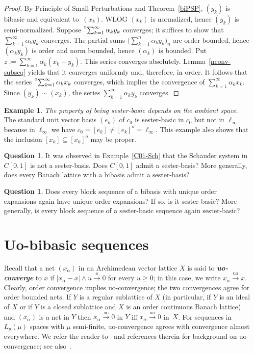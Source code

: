 \documentclass[12pt]{amsart}
\theoremstyle{plain}
\theoremstyle{definition}
\newtheorem{question}[theorem]{Question}
\newtheorem{example}[theorem]{Example}
\newcommand{\abs}[1]{\lvert#1\rvert}
\newcommand{\term}[1]{{\textit{\textbf{#1}}}}   %
\newcommand{\goeso}{\xrightarrow{\mathrm{o}}}	%
\newcommand{\goesuo}{\xrightarrow{\mathrm{uo}}}	%
\newcommand{\s}{\sum_{k=1}^\infty}
\newcommand{\tos}{\prescript{{\rm o}}{}{\sum_{k=1}^\infty\,}}
\renewcommand{\ge}{\geqslant}
\begin{document}
\begin{proof}
  By Principle of Small Perturbations and Theorem~\ref{biPSP}, $(y_k)$
  is bibasic and equivalent to~$(x_k)$. WLOG $(x_k)$ is normalized,
  hence $(y_k)$ is semi-normalized. Suppose $\tos\alpha_ky_k$
  converges; it suffices to show that $\s\alpha_ky_k$ converges. The
  partial sums $\bigl(\sum_{k=1}^n \alpha_ky_k\bigr)_n$ are order
  bounded, hence $(\alpha_k y_k)$ is order and norm bounded, hence
  $(\alpha_k)$ is bounded.  Put
  $z:=\sum_{k=1}^\infty \alpha_k(x_k-y_k)$. This series converges
  absolutely. Lemma~\ref{nconv-subseq} yields that it converges
  uniformly and, therefore, in order. It follows that the series
  $\tos\alpha_kx_k$ converges, which implies the convergence of
  $\s\alpha_kx_k$. Since $(y_k)\sim(x_k)$, the series $\s\alpha_ky_k$
  converges.
\end{proof}

\begin{example}\label{sester-dep-amb}
    \emph{The
    property of being sester-basic depends on the ambient space.}
    The standard unit vector basis $(e_k)$ of $c_0$ is
    sester-basic in $c_0$ but not in $\ell_\infty$ because in
    $\ell_\infty$ we have $c_0=[e_k]\neq[e_k]^o=\ell_\infty$. This
    example also shows that the inclusion $[x_k]\subseteq[x_k]^o$ may
    be proper.
\end{example}

\begin{question}
  It was observed in Example~\ref{C01-Sch} that the Schauder system in
  $C[0,1]$ is not a sester-basis. Does $C[0,1]$ admit a sester-basis?
  More generally, does every Banach lattice with a bibasis admit a
  sester-basis?
\end{question}

\begin{question}
  Does every block sequence of a bibasis with unique order expansions
  again have unique order expansions? If so, is it sester-basic? More
  generally, is every block sequence of a sester-basic sequence again
  sester-basic?
\end{question}


\section{Uo-bibasic sequences}

Recall that a net $(x_\alpha)$ in an Archimedean vector lattice $X$ is
said to \term{uo-converge} to $x$ if
$\abs{x_\alpha-x}\wedge u\goeso 0$ for every $u\ge 0$; in this case,
we write $x_\alpha\goesuo x$. Clearly, order convergence implies
uo-convergence; the two convergences agree for order bounded nets. If
$Y$ is a regular sublattice of $X$ (in particular, if $Y$ is an ideal
of $X$ or if $Y$ is a closed sublattice and $X$ is an order continuous
Banach lattice) and $(x_\alpha)$ is a net in $Y$ then
$x_\alpha\goesuo 0$ in $Y$ iff $x_\alpha\goesuo 0$ in~$X$. For
sequences in $L_p(\mu)$ spaces with $\mu$ semi-finite, uo-convergence
agrees with convergence almost everywhere. We refer the reader
to~\cite{Gao:17} and references therein for background on
uo-convergence; see also~\cite{Papangelou:64,Fremlin:04}.
\end{document}
